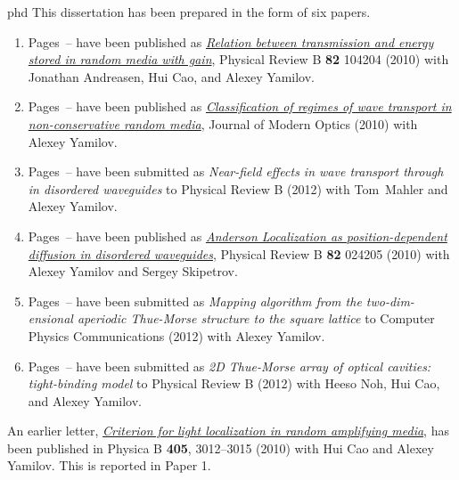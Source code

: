 \documentclass[times,12pt,titlepage]{mstthesis} %
\begin{document}


\begin{ThesisPublicationOption}{phd}
This dissertation has been prepared in the form of six papers.

\renewcommand{\theenumi}{Paper \arabic{enumi}}
\begin{enumerate}%

\item Pages~\pageref{paper:1_start}--\pageref{paper:1_end} have been published as  
  \textit{\href{http://link.aps.org/doi/10.1103/PhysRevB.82.104204}{Relation between transmission and energy stored in random media with gain}}, Physical Review B \textbf{82} 104204 (2010) with Jonathan Andreasen, Hui Cao, and Alexey Yamilov.
\item Pages~\pageref{paper:2_start}--\pageref{paper:2_end} have been published as 
  \textit{\href{http://dx.doi.org/10.1080/09500340.2010.519443}{Classification of regimes of wave transport in non-conservative random media}}, Journal of Modern Optics (2010) with Alexey Yamilov.
\item Pages~\pageref{paper:3_start}--\pageref{paper:3_end} have been submitted as
  \textit{Near-field effects in wave transport through in disordered waveguides} to Physical Review B (2012) with Tom~Mahler and Alexey Yamilov.
\item Pages~\pageref{paper:4_start}--\pageref{paper:4_end} have been published as 
  \textit{\href{http://link.aps.org/doi/10.1103/PhysRevB.82.024205}{Anderson Localization as position-dependent diffusion in disordered waveguides}}, 
  Physical Review B \textbf{82} 024205 (2010) with Alexey Yamilov and Sergey Skipetrov.  
\item Pages~\pageref{paper:5_start}--\pageref{paper:5_end} have been submitted as 
  \textit{Mapping algorithm from the two-dim-\\ensional aperiodic Thue-Morse structure to the square lattice} to Computer Physics Communications (2012) with Alexey Yamilov.
\item Pages~\pageref{paper:6_start}--\pageref{paper:6_end} have been submitted as 
  \textit{2D Thue-Morse array of optical cavities: tight-binding model} to Physical Review B (2012) with Heeso Noh, Hui Cao, and Alexey Yamilov.
\end{enumerate}
\renewcommand{\theenumi}{\arabic{enumi}}

An earlier letter, 
\textit{\href{http://dx.doi.org/10.1016/j.physb.2010.01.025}{Criterion for light localization in random amplifying media}}, 
has been published in Physica B \textbf{405}, 3012--3015 (2010) with Hui Cao and Alexey Yamilov. This is reported in Paper 1.

\end{ThesisPublicationOption}
\end{document}
